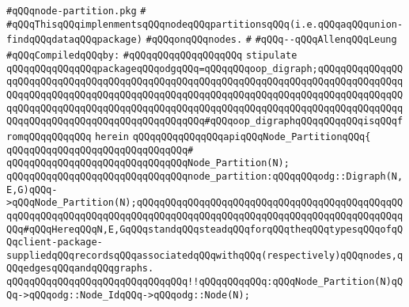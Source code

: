 \label{src/lib/graph/node-partition.pkg}
\verb|#qQQqnode-partition.pkg|\newline
\verb|#|\newline
\verb|#qQQqThisqQQqimplenmentsqQQqnodeqQQqpartitionsqQQq(i.e.qQQqaqQQqunion-findqQQqdataqQQqpackage)|\newline
\verb|#qQQqonqQQqnodes.|\newline
\verb|#|\newline
\verb|#qQQq--qQQqAllenqQQqLeung|\newline
\newline
\verb|#qQQqCompiledqQQqby:|\newline
\verb|#qQQqqQQqqQQqqQQqqQQq|\newline
\newline
\newline
\newline
\verb|stipulate|\newline
\verb|qQQqqQQqqQQqqQQqpackageqQQqodgqQQq=qQQqqQQqoop_digraph;qQQqqQQqqQQqqQQqqQQqqQQqqQQqqQQqqQQqqQQqqQQqqQQqqQQqqQQqqQQqqQQqqQQqqQQqqQQqqQQqqQQqqQQqqQQqqQQqqQQqqQQqqQQqqQQqqQQqqQQqqQQqqQQqqQQqqQQqqQQqqQQqqQQqqQQqqQQqqQQqqQQqqQQqqQQqqQQqqQQqqQQqqQQqqQQqqQQqqQQqqQQqqQQqqQQqqQQqqQQqqQQqqQQqqQQqqQQqqQQqqQQqqQQqqQQqqQQqqQQq#qQQqoop_digraphqQQqqQQqqQQqisqQQqfromqQQqqQQqqQQq|\newline
\verb|herein|\newline
\newline
\verb|qQQqqQQqqQQqqQQqapiqQQqNode_PartitionqQQq{|\newline
\verb|qQQqqQQqqQQqqQQqqQQqqQQqqQQqqQQq#|\newline
\verb|qQQqqQQqqQQqqQQqqQQqqQQqqQQqqQQqNode_Partition(N);|\newline
\newline
\verb|qQQqqQQqqQQqqQQqqQQqqQQqqQQqqQQqnode_partition:qQQqqQQqodg::Digraph(N,E,G)qQQq->qQQqNode_Partition(N);qQQqqQQqqQQqqQQqqQQqqQQqqQQqqQQqqQQqqQQqqQQqqQQqqQQqqQQqqQQqqQQqqQQqqQQqqQQqqQQqqQQqqQQqqQQqqQQqqQQqqQQqqQQqqQQqqQQqqQQq#qQQqHereqQQqN,E,GqQQqstandqQQqsteadqQQqforqQQqtheqQQqtypesqQQqofqQQqclient-package-suppliedqQQqrecordsqQQqassociatedqQQqwithqQQq(respectively)qQQqnodes,qQQqedgesqQQqandqQQqgraphs.|\newline
\newline
\verb|qQQqqQQqqQQqqQQqqQQqqQQqqQQqqQQq!!qQQqqQQqqQQq:qQQqNode_Partition(N)qQQq->qQQqodg::Node_IdqQQq->qQQqodg::Node(N);|\newline
